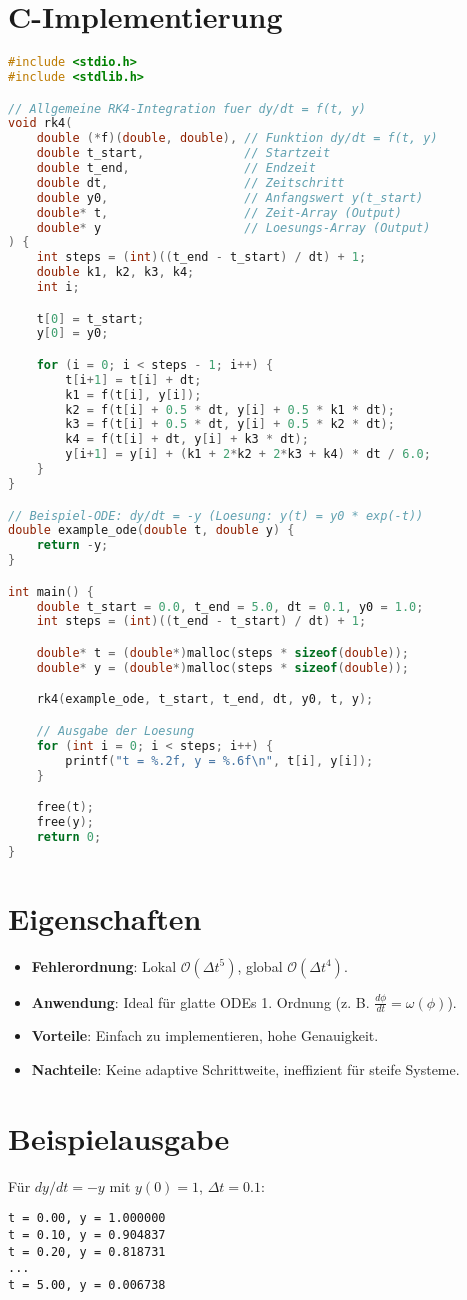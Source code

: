 \section*{C-Implementierung}
\begin{lstlisting}[language=C, caption={Generische RK4-Implementierung}, frame=tb, backgroundcolor=\color{gray!10}, commentstyle=\color{teal}]
#include <stdio.h>
#include <stdlib.h>

// Allgemeine RK4-Integration fuer dy/dt = f(t, y)
void rk4(
    double (*f)(double, double), // Funktion dy/dt = f(t, y)
    double t_start,              // Startzeit
    double t_end,                // Endzeit
    double dt,                   // Zeitschritt
    double y0,                   // Anfangswert y(t_start)
    double* t,                   // Zeit-Array (Output)
    double* y                    // Loesungs-Array (Output)
) {
    int steps = (int)((t_end - t_start) / dt) + 1;
    double k1, k2, k3, k4;
    int i;

    t[0] = t_start;
    y[0] = y0;

    for (i = 0; i < steps - 1; i++) {
        t[i+1] = t[i] + dt;
        k1 = f(t[i], y[i]);
        k2 = f(t[i] + 0.5 * dt, y[i] + 0.5 * k1 * dt);
        k3 = f(t[i] + 0.5 * dt, y[i] + 0.5 * k2 * dt);
        k4 = f(t[i] + dt, y[i] + k3 * dt);
        y[i+1] = y[i] + (k1 + 2*k2 + 2*k3 + k4) * dt / 6.0;
    }
}

// Beispiel-ODE: dy/dt = -y (Loesung: y(t) = y0 * exp(-t))
double example_ode(double t, double y) {
    return -y;
}

int main() {
    double t_start = 0.0, t_end = 5.0, dt = 0.1, y0 = 1.0;
    int steps = (int)((t_end - t_start) / dt) + 1;

    double* t = (double*)malloc(steps * sizeof(double));
    double* y = (double*)malloc(steps * sizeof(double));

    rk4(example_ode, t_start, t_end, dt, y0, t, y);

    // Ausgabe der Loesung
    for (int i = 0; i < steps; i++) {
        printf("t = %.2f, y = %.6f\n", t[i], y[i]);
    }

    free(t);
    free(y);
    return 0;
}
\end{lstlisting}

\section*{Eigenschaften}
\begin{itemize}
    \item \textbf{Fehlerordnung}: Lokal \(\mathcal{O}(\Delta t^5)\), global \(\mathcal{O}(\Delta t^4)\).
    \item \textbf{Anwendung}: Ideal für glatte ODEs 1. Ordnung (z. B. \( \frac{d\phi}{dt} = \omega(\phi) \)).
    \item \textbf{Vorteile}: Einfach zu implementieren, hohe Genauigkeit.
    \item \textbf{Nachteile}: Keine adaptive Schrittweite, ineffizient für steife Systeme.
\end{itemize}

\section*{Beispielausgabe}
Für \( dy/dt = -y \) mit \( y(0) = 1 \), \( \Delta t = 0.1 \):
\begin{verbatim}
t = 0.00, y = 1.000000
t = 0.10, y = 0.904837
t = 0.20, y = 0.818731
...
t = 5.00, y = 0.006738
\end{verbatim}
